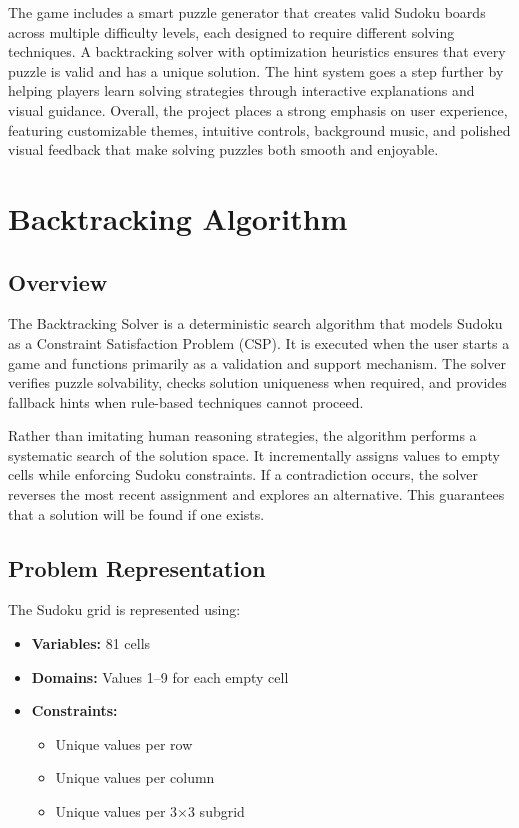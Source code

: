\documentclass[12pt,a4paper]{article}
\begin{document}
The game includes a smart puzzle generator that creates valid Sudoku boards across multiple difficulty levels, each designed to require different solving techniques. A backtracking solver with optimization heuristics ensures that every puzzle is valid and has a unique solution. The hint system goes a step further by helping players learn solving strategies through interactive explanations and visual guidance. Overall, the project places a strong emphasis on user experience, featuring customizable themes, intuitive controls, background music, and polished visual feedback that make solving puzzles both smooth and enjoyable.

\section{Backtracking Algorithm}

\subsection{Overview}
The Backtracking Solver is a deterministic search algorithm that models Sudoku as a Constraint Satisfaction Problem (CSP). It is executed when the user starts a game and functions primarily as a validation and support mechanism. The solver verifies puzzle solvability, checks solution uniqueness when required, and provides fallback hints when rule-based techniques cannot proceed.

Rather than imitating human reasoning strategies, the algorithm performs a systematic search of the solution space. It incrementally assigns values to empty cells while enforcing Sudoku constraints. If a contradiction occurs, the solver reverses the most recent assignment and explores an alternative. This guarantees that a solution will be found if one exists.

\subsection{Problem Representation}
The Sudoku grid is represented using:
\begin{itemize}
    \item \textbf{Variables:} 81 cells
    \item \textbf{Domains:} Values 1–9 for each empty cell
    \item \textbf{Constraints:}
    \begin{itemize}[label=$\circ$]
        \item Unique values per row
        \item Unique values per column
        \item Unique values per 3$\times$3 subgrid
    \end{itemize}
\end{itemize}
\end{document}
